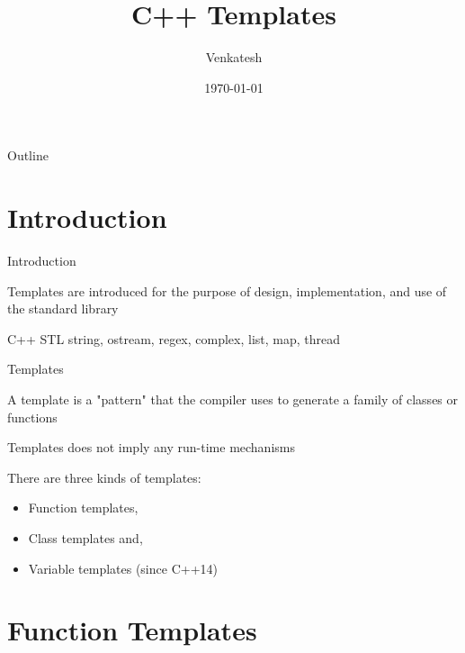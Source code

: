 \documentclass{beamer}
\title{C++ Templates} %
\author{Venkatesh} %
\institute{WDC}
\date{\today} %
\begin{document}
\lstset{breakatwhitespace=true,
language=C++,
columns=fullflexible,
keepspaces=true,
breaklines=true,
tabsize=3, 
showstringspaces=false,
extendedchars=true
inputencoding=utf8}


\begin{frame}
\titlepage %
\end{frame}

\begin{frame}{Outline}
  \tableofcontents
\end{frame}



\section{Introduction}
\begin{frame}{Introduction}

Templates are introduced for the purpose of design,
implementation, and use of the standard library

\begin{block}{C++ STL}
string, ostream, regex, complex, list, map, thread
\end{block}
\end{frame}

\begin{frame}{Templates}

A template is a "pattern" that the compiler uses to generate a family of classes or functions

Templates does not imply any run-time mechanisms

There are three kinds of templates:
\begin{itemize}
\item Function templates,
\item Class templates and,
\item Variable templates (since C++14)
\end{itemize}
\end{frame}

\section{Function Templates}
\end{document}
